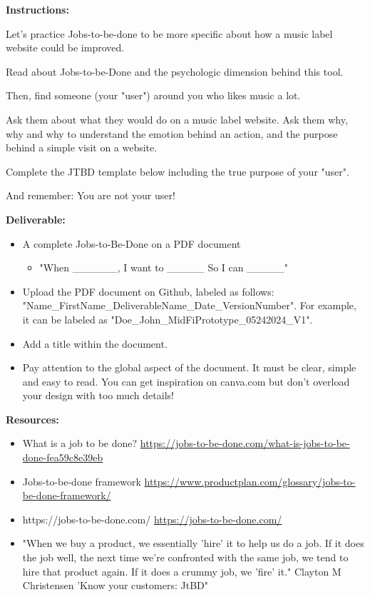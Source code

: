 \makeheaderfiles

\textbf{Instructions:}

Let's practice Jobs-to-be-done to be more specific about how a music label website could be improved.

Read about Jobs-to-be-Done and the psychologic dimension behind this tool.

Then, find someone (your "user") around you who likes music a lot.

Ask them about what they would do on a music label website. Ask them why, why and why to understand the emotion behind an action, and the purpose behind a simple visit on a website.

Complete the JTBD template below including the true purpose of your "user".

And remember: You are not your user!

\textbf{Deliverable:}

\begin{itemize}
\item A complete Jobs-to-Be-Done on a PDF document
\begin{itemize}
\item "When \_\_\_\_\_\_, I want to \_\_\_\_\_ So I can \_\_\_\_\_"
\end{itemize}
\item Upload the PDF document on Github, labeled as follows: "Name\_FirstName\_DeliverableName\_Date\_VersionNumber". For example, it can be labeled as "Doe\_John\_MidFiPrototype\_05242024\_V1".
\item Add a title within the document.
\item Pay attention to the global aspect of the document. It must be clear, simple and easy to read. You can get inspiration on canva.com but don't overload your design with too much details!
\end{itemize}

\textbf{Resources:}

\begin{itemize}
\item What is a job to be done? \url{https://jobs-to-be-done.com/what-is-jobs-to-be-done-fea59c8e39eb}
\item Jobs-to-be-done framework \url{https://www.productplan.com/glossary/jobs-to-be-done-framework/}
\item https://jobs-to-be-done.com/ \url{https://jobs-to-be-done.com/}
\item "When we buy a product, we essentially 'hire' it to help us do a job. If it does the job well, the next time we're confronted with the same job, we tend to hire that product again. If it does a crummy job, we 'fire' it." Clayton M Christensen 'Know your customers: JtBD"
\end{itemize}

